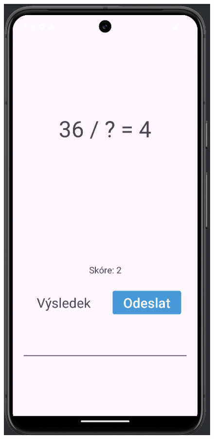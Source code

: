 \documentclass[12pt]{report}
\begin{document}
	\begin{figure}[ht]
		\centering
		\begin{minipage}{.5\textwidth}
			\centering
			\includegraphics[height=1.7\textwidth]{img/challenge_1}
			\label{fig:challenge_1}
		\end{minipage}%
		\hfill
		\begin{minipage}{.5\textwidth}
			\centering

\end{minipage}
\end{figure}
\end{document}
